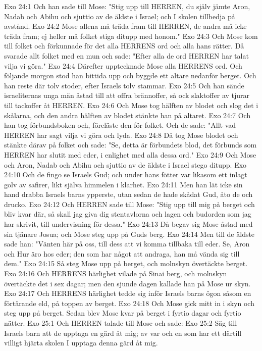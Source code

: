 Exo 24:1  Och han sade till Mose: "Stig upp till HERREN, du själv jämte Aron, Nadab och Abihu och sjuttio av de äldste i Israel; och I skolen tillbedja på avstånd.
Exo 24:2  Mose allena må träda fram till HERREN, de andra må icke träda fram; ej heller må folket stiga ditupp med honom."
Exo 24:3  Och Mose kom till folket och förkunnade för det alla HERRENS ord och alla hans rätter. Då svarade allt folket med en mun och sade: "Efter alla de ord HERREN har talat vilja vi göra."
Exo 24:4  Därefter upptecknade Mose alla HERRENS ord. Och följande morgon stod han bittida upp och byggde ett altare nedanför berget. Och han reste där tolv stoder, efter Israels tolv stammar.
Exo 24:5  Och han sände israeliternas unga män åstad till att offra brännoffer, så ock slaktoffer av tjurar till tackoffer åt HERREN.
Exo 24:6  Och Mose tog hälften av blodet och slog det i skålarna, och den andra hälften av blodet stänkte han på altaret.
Exo 24:7  Och han tog förbundsboken och, föreläste den för folket. Och de sade: "Allt vad HERREN har sagt vilja vi göra och lyda.
Exo 24:8  Då tog Mose blodet och stänkte därav på folket och sade: "Se, detta är förbundets blod, det förbunds som HERREN har slutit med eder, i enlighet med alla dessa ord."
Exo 24:9  Och Mose och Aron, Nadab och Abihu och sjuttio av de äldste i Israel stego ditupp.
Exo 24:10  Och de fingo se Israels Gud; och under hans fötter var likasom ett inlagt golv av safirer, likt själva himmelen i klarhet.
Exo 24:11  Men han lät icke sin hand drabba Israels barns ypperste, utan sedan de hade skådat Gud, åto de och drucko.
Exo 24:12  Och HERREN sade till Mose: "Stig upp till mig på berget och bliv kvar där, så skall jag giva dig stentavlorna och lagen och budorden som jag har skrivit, till undervisning för dessa."
Exo 24:13  Då begav sig Mose åstad med sin tjänare Josua; och Mose steg upp på Guds berg.
Exo 24:14  Men till de äldste sade han: "Vänten här på oss, till dess att vi komma tillbaka till eder. Se, Aron och Hur äro hos eder; den som har något att andraga, han må vända sig till dem."
Exo 24:15  Så steg Mose upp på berget, och molnskyn övertäckte berget.
Exo 24:16  Och HERRENS härlighet vilade på Sinai berg, och molnskyn övertäckte det i sex dagar; men den sjunde dagen kallade han på Mose ur skyn.
Exo 24:17  Och HERRENS härlighet tedde sig inför Israels barns ögon såsom en förtärande eld, på toppen av berget.
Exo 24:18  Och Mose gick mitt in i skyn och steg upp på berget. Sedan blev Mose kvar på berget i fyrtio dagar och fyrtio nätter.
Exo 25:1  Och HERREN talade till Mose och sade:
Exo 25:2  Säg till Israels barn att de upptaga en gärd åt mig; av var och en som har ett därtill villigt hjärta skolen I upptaga denna gärd åt mig.
